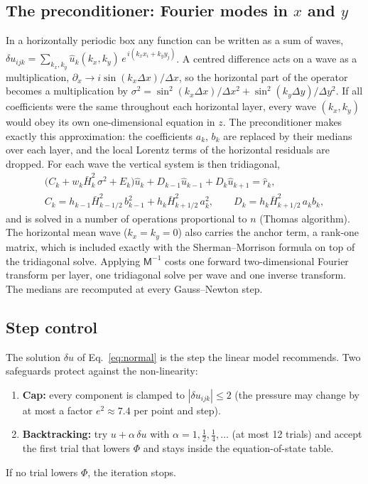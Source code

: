\subsection{\texorpdfstring{The preconditioner: Fourier modes in $x$ and $y$}{The preconditioner: Fourier modes in x and y}}\label{sec:prec}
In a horizontally periodic box any function can be written as a sum of waves,
$\delta u_{ijk}=\sum_{k_x,k_y}\hat u_k(k_x,k_y)\,e^{\,i(k_xx_i+k_yy_j)}$. A centred difference acts on a wave as a
multiplication, $\partial_x\to i\sin(k_x\Delta x)/\Delta x$, so the horizontal part of the operator becomes a multiplication
by $\sigma^2=\sin^2(k_x\Delta x)/\Delta x^2+\sin^2(k_y\Delta y)/\Delta y^2$. If all coefficients were the same throughout each
horizontal layer, every wave $(k_x,k_y)$ would obey its own one-dimensional equation in $z$. The preconditioner makes exactly
this approximation: the coefficients $a_k$, $b_k$ are replaced by their medians over each layer, and the local Lorentz terms of
the horizontal residuals are dropped. For each wave the vertical system is then tridiagonal,
\begin{equation}
\begin{gathered}
\big(C_k+w_k\bar H_k^2\,\sigma^2+E_k\big)\hat u_k+D_{k-1}\hat u_{k-1}+D_k\hat u_{k+1}=\hat r_k ,\\
C_k=h_{k-1}\bar H_{k-1/2}^2\,b_{k-1}^2+h_k\bar H_{k+1/2}^2\,a_k^2,\qquad D_k=h_k\bar H_{k+1/2}^2\,a_kb_k ,
\end{gathered}
\end{equation}
and is solved in a number of operations proportional to $n$ (Thomas algorithm). The horizontal mean wave ($k_x=k_y=0$) also
carries the anchor term, a rank-one matrix, which is included exactly with the Sherman--Morrison formula on top of the
tridiagonal solve. Applying $\mathsf M^{-1}$ costs one forward two-dimensional Fourier transform per layer, one tridiagonal
solve per wave and one inverse transform. The medians are recomputed at every Gauss--Newton step.

\subsection{Step control}
The solution $\delta u$ of Eq.~\eqref{eq:normal} is the step the linear model recommends. Two safeguards protect against the
non-linearity:
\begin{enumerate}
\item \textbf{Cap:} every component is clamped to $|\delta u_{ijk}|\le2$ (the pressure may change by at most a factor
$e^2\approx7.4$ per point and step).
\item \textbf{Backtracking:} try $u+\alpha\,\delta u$ with $\alpha=1,\tfrac12,\tfrac14,\dots$ (at most 12 trials) and accept the
first trial that lowers $\Phi$ and stays inside the equation-of-state table.
\end{enumerate}
If no trial lowers $\Phi$, the iteration stops.

